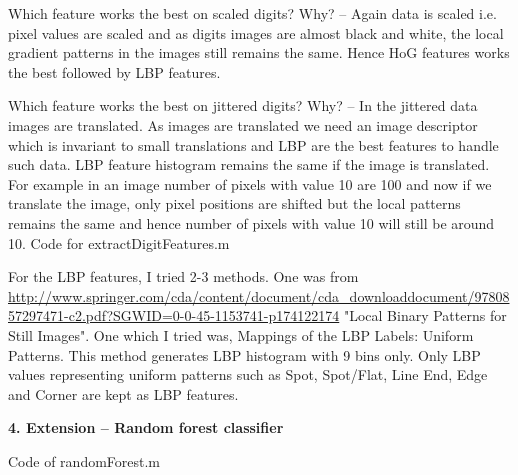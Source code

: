 \documentclass[fleqn]{article}
\begin{document}
Which feature works the best on scaled digits? Why? --
Again data is scaled i.e. pixel values are scaled and as digits images are almost black and white, the local gradient patterns in the images still remains the same. Hence HoG features works the best followed by LBP features.

Which feature works the best on jittered digits? Why? --
In the jittered data images are translated. As images are translated we need an image descriptor which is invariant to small translations and LBP are the best features to handle such data.
LBP feature histogram remains the same if the image is translated. For example in an image number of pixels with value 10 are 100 and now if we translate the image, only pixel positions are shifted but the local patterns remains the same and hence number of pixels with value 10 will still be around 10. 
\newpage
Code for extractDigitFeatures.m



For the LBP features, I tried 2-3 methods. One was from \url{http://www.springer.com/cda/content/document/cda_downloaddocument/9780857297471-c2.pdf?SGWID=0-0-45-1153741-p174122174}{ "Local Binary Patterns for Still Images"}. 
One which I tried was, Mappings of the LBP Labels: Uniform Patterns. This method generates LBP histogram with 9 bins only. Only LBP values representing uniform patterns such as Spot, Spot/Flat, Line End, Edge and Corner are kept as LBP features. 

\newpage

\textbf{\huge 4. Extension -- Random forest classifier}


Code of randomForest.m


\end{document}
